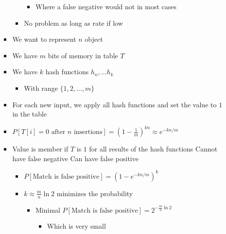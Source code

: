 \begin{itemize}
\begin{itemize}
\begin{itemize}
\begin{itemize}
\begin{itemize}
                                    \item Where a false negative would not in most cases
                                \end{itemize}
                            \item No problem as long as rate if low
                        \end{itemize}
                \end{itemize}
                \begin{itemize}
                    \item We want to represent $n$ object
                    \item We have $m$ bits of memory in table $T$
                    \item We have $k$ hash functions $h_n, \dots h_k$
                        \begin{itemize}
                            \item With range $\{1, 2, \dots, m\}$
                        \end{itemize}
                    \item For each new input, we apply all hash functions and set the value to $1$ in the table
                    \item $P[T[i] = 0 \text{ after } n \text{ insertions}] = \left( 1 - \frac{1}{m} \right)^{kn} \approx e^{-kn/m}$
                    \item Value is member if $T$ is $1$ for all results of the hash functions
                    \ipro Cannot have false negative
                    \icon Can have false positive
                        \begin{itemize}
                            \item $P[\text{Match is false positive}] = (1 - e^{-kn / m})^k$
                            \item $k \approx \frac{m}{n} \ln 2$ minimizes the probability
                                \begin{itemize}
                                    \item Minimal $P[\text{Match is false positive}] = 2^{-\frac{m}{n} \ln 2}$
                                        \begin{itemize}
                                            \item Which is very small
                                        \end{itemize}

\end{itemize}
\end{itemize}
\end{itemize}
\end{itemize}
\end{itemize}
